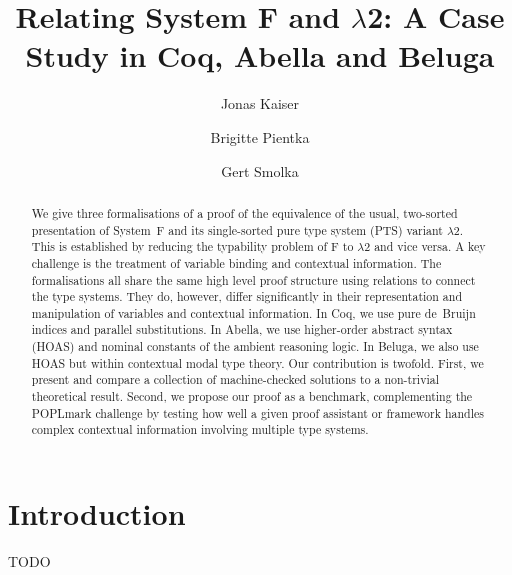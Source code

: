 \documentclass[a4paper,UKenglish]{lipics-v2016}
\title{Relating System F and $\lambda$2: A Case Study in Coq, Abella and Beluga}
\author[1]{Jonas Kaiser}
\author[2]{Brigitte Pientka}
\author[1]{Gert Smolka}
\affil[1]{Saarland University, Saarbrücken, Germany\\
  \texttt{\{jkaiser,smolka\}}@ps.uni-saarland.de}
\affil[2]{school, city, country\\
  \texttt{MAIL}}
\newcommand{\SysL}{$\lambda$2\xspace}
\begin{document}
\maketitle

\begin{abstract}
  We give three formalisations of a proof of the equivalence of the usual, two-sorted presentation of System~F and its single-sorted pure type system (PTS) variant \SysL.
  This is established by reducing the typability problem of F to \SysL and vice versa.
  A key challenge is the treatment of variable binding and contextual information.
  The formalisations all share the same high level proof structure using relations to connect the type systems.
  They do, however, differ significantly in their representation and manipulation of variables and contextual information.
  In Coq, we use pure de~Bruijn indices and parallel substitutions.
  In Abella, we use higher-order abstract syntax (HOAS) and nominal constants of the ambient reasoning logic.
  In Beluga, we also use HOAS but within contextual modal type theory.
  Our contribution is twofold.
  First, we present and compare a collection of machine-checked solutions to a non-trivial theoretical result.
  Second, we propose our proof as a benchmark, complementing the POPLmark challenge by testing how well a given proof assistant or framework handles complex contextual information involving multiple type systems.
\end{abstract}

\section{Introduction}

TODO
\end{document}
